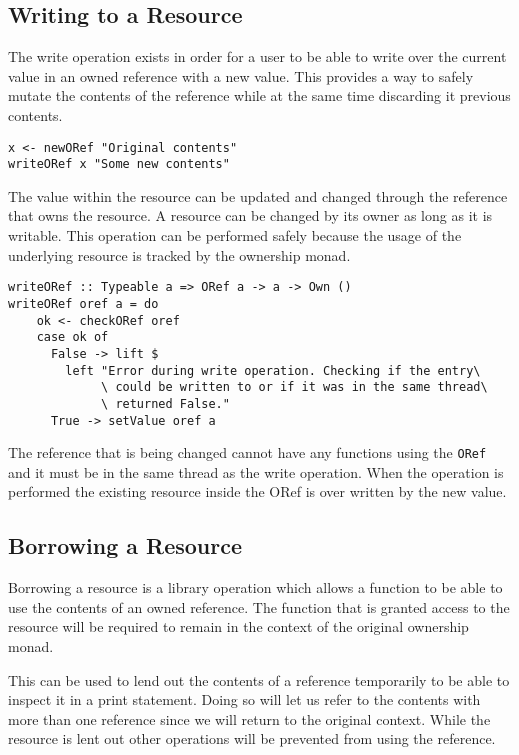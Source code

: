 \documentclass[onehalf,11pt]{beavtex}
\begin{document}
\subsection{Writing to a Resource}

The write operation exists in order for a user to be able to write over the
current value in an owned reference with a new value. This provides a way to
safely mutate the contents of the reference while at the same time discarding
it previous contents.

\begin{verbatim}
x <- newORef "Original contents"
writeORef x "Some new contents"
\end{verbatim}

The value within the resource can be updated and changed through the reference
that owns the resource.
A resource can be changed by its owner as long as it is writable.
This operation can be performed safely because the usage
of the underlying resource is tracked by the ownership monad.

\begin{verbatim}
writeORef :: Typeable a => ORef a -> a -> Own ()
writeORef oref a = do
    ok <- checkORef oref
    case ok of
      False -> lift $
        left "Error during write operation. Checking if the entry\
             \ could be written to or if it was in the same thread\
             \ returned False."
      True -> setValue oref a
\end{verbatim}

The reference that is being changed cannot have any functions using the
\texttt{ORef} and it must be in the same thread as the write operation.
When the operation is performed the existing resource inside the ORef is over
written by the new value.

\subsection{Borrowing a Resource}

Borrowing a resource is a library operation which allows a function to be able
to use the contents of an owned reference.
The function that is granted access to the resource will be required to remain
in the context of the original ownership monad.

This can be used to lend out the contents of a reference temporarily to be
able to inspect it in a print statement.  Doing so will let us refer to the
contents with more than one reference since we will return to the original
context.  While the resource is lent out other operations will be prevented
from using the reference.
\end{document}
